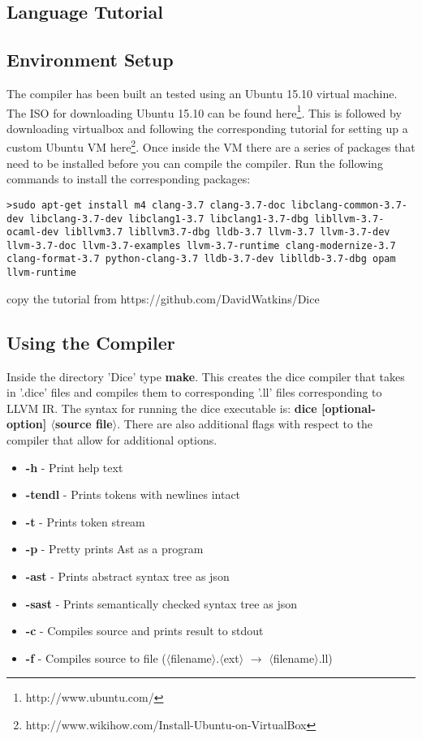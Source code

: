 \begin{homeworkProblem}
	\chapter{Language Tutorial}
	\section{Environment Setup}
	The compiler has been built an tested using an Ubuntu 15.10 virtual machine. The ISO for downloading Ubuntu 15.10 can be found here\footnote{http://www.ubuntu.com/}. This is followed by downloading virtualbox and following the corresponding tutorial for setting up a custom Ubuntu VM here\footnote{http://www.wikihow.com/Install-Ubuntu-on-VirtualBox}. 
	Once inside the VM there are a series of packages that need to be installed before you can compile the compiler. Run the following commands to install the corresponding packages:
	\begin{verbatim}
>sudo apt-get install m4 clang-3.7 clang-3.7-doc libclang-common-3.7-dev libclang-3.7-dev libclang1-3.7 libclang1-3.7-dbg libllvm-3.7-ocaml-dev libllvm3.7 libllvm3.7-dbg lldb-3.7 llvm-3.7 llvm-3.7-dev llvm-3.7-doc llvm-3.7-examples llvm-3.7-runtime clang-modernize-3.7 clang-format-3.7 python-clang-3.7 lldb-3.7-dev liblldb-3.7-dbg opam llvm-runtime
	\end{verbatim}
	copy the tutorial from https://github.com/DavidWatkins/Dice
	\section{Using the Compiler}
	Inside the directory 'Dice' type \textbf{make}. This creates the dice compiler that takes in '.dice' files and compiles them to corresponding '.ll' files corresponding to LLVM IR. The syntax for running the dice executable is: \textbf{dice [optional-option] $\langle$source file$\rangle$}. There are also additional flags with respect to the compiler that allow for additional options.
	\begin{itemize}
		\item \textbf{-h} - Print help text
		\item \textbf{-tendl} - Prints tokens with newlines intact
		\item \textbf{-t} - Prints token stream
		\item \textbf{-p} - Pretty prints Ast as a program
		\item \textbf{-ast} - Prints abstract syntax tree as json
		\item \textbf{-sast} - Prints semantically checked syntax tree as json
		\item \textbf{-c} - Compiles source and prints result to stdout
		\item \textbf{-f} - Compiles source to file ($\langle$filename$\rangle$.$\langle$ext$\rangle$ $\rightarrow$ $\langle$filename$\rangle$.ll)
	\end{itemize}
	

\end{homeworkProblem}
